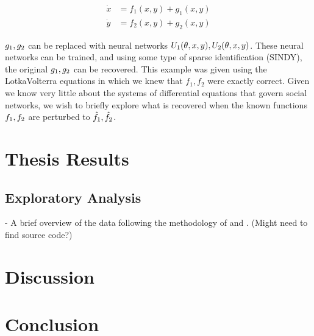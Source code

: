 \documentclass[12pt]{article}
\begin{document}
        \begin{align}
            \dot x &= f_1(x,y)+g_1(x,y) \\
            \dot y &= f_2(x,y)+g_2(x,y)
        \end{align}
        
        ${g_1, \space g_2}$ can be replaced with neural networks $U_1(\theta, x, y), \space U_2(\theta, x, y)$. These neural networks can be trained, and using some type of sparse identification (SINDY), the original $g_1, \space g_2$ can be recovered. This example was given using the Lotka\-Volterra equations in which we knew that $f_1, f_2$ were exactly correct. Given we know very little about the systems of differential equations that govern social networks, we wish to briefly explore what is recovered when the known functions $f_1, \space f_2$ are perturbed to $\hat f_1, \space \hat f_2$. 
\section{Thesis Results}
\subsection{Exploratory Analysis}
- A brief overview of the data following the methodology of \cite{zhao2012multi} and \cite{garg2009evolution}. (Might need to find source code?)
\section{Discussion}

\section{Conclusion}

\printbibliography
\end{document}
